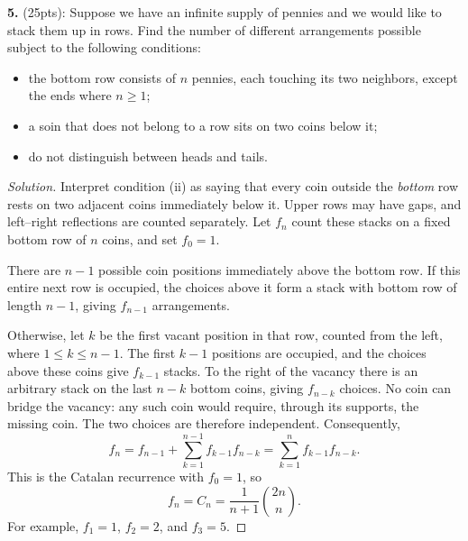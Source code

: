 \documentclass[12pt]{amsart}
\newenvironment{solution}
{\begin{proof}[Solution]}
{\end{proof}}
\begin{document}
\begin{onehalfspace}
        \noindent\textbf{5.} (25pts): Suppose we have an infinite supply of pennies and we would
        like to stack them up in rows.
        Find the number of different arrangements possible subject to the following conditions:
        \begin{itemize}
            \item[(i)] the bottom row consists of $n$ pennies, each touching its two neighbors,
            except the ends where $n\ge 1$;
            \item[(ii)] a soin that does not belong to a row sits on two coins below it;
            \item[(iii)] do not distinguish between heads and tails.
        \end{itemize}

        \begin{solution}
            Interpret condition (ii) as saying that every coin outside the
            \emph{bottom} row rests on two adjacent coins immediately below
            it.  Upper rows may have gaps, and left--right reflections are
            counted separately.  Let $f_n$ count these stacks on a fixed
            bottom row of $n$ coins, and set $f_0=1$.

            There are $n-1$ possible coin positions immediately above the
            bottom row.  If this entire next row is occupied, the choices
            above it form a stack with bottom row of length $n-1$, giving
            $f_{n-1}$ arrangements.

            Otherwise, let $k$ be the first vacant position in that row,
            counted from the left, where $1\le k\le n-1$.  The first $k-1$
            positions are occupied, and the choices above these coins give
            $f_{k-1}$ stacks.  To the right of the vacancy there is an arbitrary
            stack on the last $n-k$ bottom coins, giving $f_{n-k}$ choices.
            No coin can bridge the vacancy: any such coin would require,
            through its supports, the missing coin.  The two choices are
            therefore independent.  Consequently,
            \[
                f_n=f_{n-1}+\sum_{k=1}^{n-1}f_{k-1}f_{n-k}
                =\sum_{k=1}^{n}f_{k-1}f_{n-k}.
            \]
            This is the Catalan recurrence with $f_0=1$, so
            \[
                f_n=C_n=\frac{1}{n+1}\binom{2n}{n}.
            \]
            For example, $f_1=1$, $f_2=2$, and $f_3=5$.
        \end{solution}



\end{onehalfspace}
\end{document}
